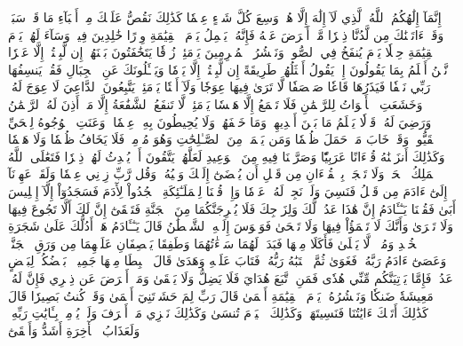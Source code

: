 إِنَّمَآ إِلَٰهُكُمُ ٱللَّهُ ٱلَّذِي لَآ إِلَٰهَ إِلَّا هُوَۚ وَسِعَ كُلَّ شَيۡءٍ عِلۡمٗا
كَذَٰلِكَ نَقُصُّ عَلَيۡكَ مِنۡ أَنۢبَآءِ مَا قَدۡ سَبَقَۚ وَقَدۡ ءَاتَيۡنَٰكَ مِن لَّدُنَّا ذِكۡرٗا
مَّنۡ أَعۡرَضَ عَنۡهُ فَإِنَّهُۥ يَحۡمِلُ يَوۡمَ ٱلۡقِيَٰمَةِ وِزۡرًا
خَٰلِدِينَ فِيهِۖ وَسَآءَ لَهُمۡ يَوۡمَ ٱلۡقِيَٰمَةِ حِمۡلٗا
يَوۡمَ يُنفَخُ فِي ٱلصُّورِۚ وَنَحۡشُرُ ٱلۡمُجۡرِمِينَ يَوۡمَئِذٖ زُرۡقٗا
يَتَخَٰفَتُونَ بَيۡنَهُمۡ إِن لَّبِثۡتُمۡ إِلَّا عَشۡرٗا
نَّحۡنُ أَعۡلَمُ بِمَا يَقُولُونَ إِذۡ يَقُولُ أَمۡثَلُهُمۡ طَرِيقَةً إِن لَّبِثۡتُمۡ إِلَّا يَوۡمٗا
وَيَسۡـَٔلُونَكَ عَنِ ٱلۡجِبَالِ فَقُلۡ يَنسِفُهَا رَبِّي نَسۡفٗا
فَيَذَرُهَا قَاعٗا صَفۡصَفٗا
لَّا تَرَىٰ فِيهَا عِوَجٗا وَلَآ أَمۡتٗا
يَوۡمَئِذٖ يَتَّبِعُونَ ٱلدَّاعِيَ لَا عِوَجَ لَهُۥۖ وَخَشَعَتِ ٱلۡأَصۡوَاتُ لِلرَّحۡمَٰنِ فَلَا تَسۡمَعُ إِلَّا هَمۡسٗا
يَوۡمَئِذٖ لَّا تَنفَعُ ٱلشَّفَٰعَةُ إِلَّا مَنۡ أَذِنَ لَهُ ٱلرَّحۡمَٰنُ وَرَضِيَ لَهُۥ قَوۡلٗا
يَعۡلَمُ مَا بَيۡنَ أَيۡدِيهِمۡ وَمَا خَلۡفَهُمۡ وَلَا يُحِيطُونَ بِهِۦ عِلۡمٗا
۞وَعَنَتِ ٱلۡوُجُوهُ لِلۡحَيِّ ٱلۡقَيُّومِۖ وَقَدۡ خَابَ مَنۡ حَمَلَ ظُلۡمٗا
وَمَن يَعۡمَلۡ مِنَ ٱلصَّـٰلِحَٰتِ وَهُوَ مُؤۡمِنٞ فَلَا يَخَافُ ظُلۡمٗا وَلَا هَضۡمٗا
وَكَذَٰلِكَ أَنزَلۡنَٰهُ قُرۡءَانًا عَرَبِيّٗا وَصَرَّفۡنَا فِيهِ مِنَ ٱلۡوَعِيدِ لَعَلَّهُمۡ يَتَّقُونَ أَوۡ يُحۡدِثُ لَهُمۡ ذِكۡرٗا
فَتَعَٰلَى ٱللَّهُ ٱلۡمَلِكُ ٱلۡحَقُّۗ وَلَا تَعۡجَلۡ بِٱلۡقُرۡءَانِ مِن قَبۡلِ أَن يُقۡضَىٰٓ إِلَيۡكَ وَحۡيُهُۥۖ وَقُل رَّبِّ زِدۡنِي عِلۡمٗا
وَلَقَدۡ عَهِدۡنَآ إِلَىٰٓ ءَادَمَ مِن قَبۡلُ فَنَسِيَ وَلَمۡ نَجِدۡ لَهُۥ عَزۡمٗا
وَإِذۡ قُلۡنَا لِلۡمَلَـٰٓئِكَةِ ٱسۡجُدُواْ لِأٓدَمَ فَسَجَدُوٓاْ إِلَّآ إِبۡلِيسَ أَبَىٰ
فَقُلۡنَا يَـٰٓـَٔادَمُ إِنَّ هَٰذَا عَدُوّٞ لَّكَ وَلِزَوۡجِكَ فَلَا يُخۡرِجَنَّكُمَا مِنَ ٱلۡجَنَّةِ فَتَشۡقَىٰٓ
إِنَّ لَكَ أَلَّا تَجُوعَ فِيهَا وَلَا تَعۡرَىٰ
وَأَنَّكَ لَا تَظۡمَؤُاْ فِيهَا وَلَا تَضۡحَىٰ
فَوَسۡوَسَ إِلَيۡهِ ٱلشَّيۡطَٰنُ قَالَ يَـٰٓـَٔادَمُ هَلۡ أَدُلُّكَ عَلَىٰ شَجَرَةِ ٱلۡخُلۡدِ وَمُلۡكٖ لَّا يَبۡلَىٰ
فَأَكَلَا مِنۡهَا فَبَدَتۡ لَهُمَا سَوۡءَٰتُهُمَا وَطَفِقَا يَخۡصِفَانِ عَلَيۡهِمَا مِن وَرَقِ ٱلۡجَنَّةِۚ وَعَصَىٰٓ ءَادَمُ رَبَّهُۥ فَغَوَىٰ
ثُمَّ ٱجۡتَبَٰهُ رَبُّهُۥ فَتَابَ عَلَيۡهِ وَهَدَىٰ
قَالَ ٱهۡبِطَا مِنۡهَا جَمِيعَۢاۖ بَعۡضُكُمۡ لِبَعۡضٍ عَدُوّٞۖ فَإِمَّا يَأۡتِيَنَّكُم مِّنِّي هُدٗى فَمَنِ ٱتَّبَعَ هُدَايَ فَلَا يَضِلُّ وَلَا يَشۡقَىٰ
وَمَنۡ أَعۡرَضَ عَن ذِكۡرِي فَإِنَّ لَهُۥ مَعِيشَةٗ ضَنكٗا وَنَحۡشُرُهُۥ يَوۡمَ ٱلۡقِيَٰمَةِ أَعۡمَىٰ
قَالَ رَبِّ لِمَ حَشَرۡتَنِيٓ أَعۡمَىٰ وَقَدۡ كُنتُ بَصِيرٗا
قَالَ كَذَٰلِكَ أَتَتۡكَ ءَايَٰتُنَا فَنَسِيتَهَاۖ وَكَذَٰلِكَ ٱلۡيَوۡمَ تُنسَىٰ
وَكَذَٰلِكَ نَجۡزِي مَنۡ أَسۡرَفَ وَلَمۡ يُؤۡمِنۢ بِـَٔايَٰتِ رَبِّهِۦۚ وَلَعَذَابُ ٱلۡأٓخِرَةِ أَشَدُّ وَأَبۡقَىٰٓ
